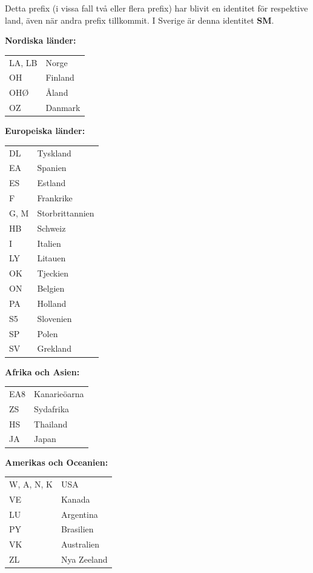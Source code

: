 Detta prefix (i vissa fall två eller flera prefix) har blivit en
identitet för respektive land, även när andra prefix tillkommit. I
Sverige är denna identitet \textbf{SM}.

\textbf{Nordiska länder:}

\begin{tabular}{ll}
  LA, LB & Norge\\
  OH & Finland\\
  OHØ & Åland\\
  OZ & Danmark\\
\end{tabular}

\textbf{Europeiska länder:}

\begin{tabular}{ll}
  DL & Tyskland\\
  EA & Spanien\\
  ES & Estland\\
  F & Frankrike\\
  G, M & Storbrittannien\\
  HB & Schweiz\\
  I & Italien\\
  LY & Litauen\\
  OK & Tjeckien\\
  ON & Belgien\\
  PA & Holland\\
  S5 & Slovenien\\
  SP & Polen\\
  SV & Grekland\\
\end{tabular}

\textbf{Afrika och Asien:}

\begin{tabular}{ll}
  EA8 & Kanarieöarna\\
  ZS & Sydafrika\\
  HS & Thailand\\
  JA & Japan\\
\end{tabular}

\textbf{Amerikas och Oceanien:}
    
\begin{tabular}{ll}
  W, A, N, K & USA\\
  VE & Kanada\\
  LU & Argentina\\
  PY & Brasilien\\
  VK & Australien\\
  ZL & Nya Zeeland\\
\end{tabular}

